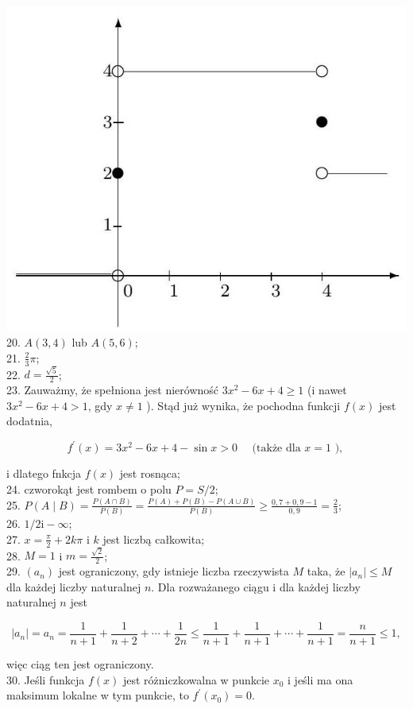 \documentclass[10pt]{article}
\begin{document}
\includegraphics[max width=\textwidth, center]{2024_11_21_7d1c5282a8fcc5ab838ag-3}\\
20. \(A(3,4)\) lub \(A(5,6)\);\\
21. \(\frac{2}{3} \pi\);\\
22. \(d=\frac{\sqrt{5}}{2}\);\\
23. Zauważmy, że spełniona jest nierówność \(3 x^{2}-6 x+4 \geqslant 1\) (i nawet \(3 x^{2}-6 x+4>1\), gdy \(x \neq 1\) ). Stąd już wynika, że pochodna funkcji \(f(x)\) jest dodatnia,

\[
f^{\prime}(x)=3 x^{2}-6 x+4-\sin x>0 \quad \text { (także dla } x=1 \text { ), }
\]

i dlatego fnkcja \(f(x)\) jest rosnąca;\\
24. czworokąt jest rombem o polu \(P=S / 2\);\\
25. \(P(A \mid B)=\frac{P(A \cap B)}{P(B)}=\frac{P(A)+P(B)-P(A \cup B)}{P(B)} \geqslant \frac{0,7+0,9-1}{0,9}=\frac{2}{3}\);\\
26. \(1 / 2 \mathrm{i}-\infty\);\\
27. \(x=\frac{\pi}{2}+2 k \pi\) i \(k\) jest liczbą całkowita;\\
28. \(M=1\) i \(m=\frac{\sqrt{2}}{2}\);\\
29. \(\left(a_{n}\right)\) jest ograniczony, gdy istnieje liczba rzeczywista \(M\) taka, że \(\left|a_{n}\right| \leqslant M\) dla każdej liczby naturalnej \(n\). Dla rozważanego ciągu i dla każdej liczby naturalnej \(n\) jest

\[
\left|a_{n}\right|=a_{n}=\frac{1}{n+1}+\frac{1}{n+2}+\cdots+\frac{1}{2 n} \leqslant \frac{1}{n+1}+\frac{1}{n+1}+\cdots+\frac{1}{n+1}=\frac{n}{n+1} \leqslant 1,
\]

więc ciąg ten jest ograniczony.\\
30. Jeśli funkcja \(f(x)\) jest różniczkowalna w punkcie \(x_{0}\) i jeśli ma ona maksimum lokalne w tym punkcie, to \(f^{\prime}\left(x_{0}\right)=0\).
\end{document}
